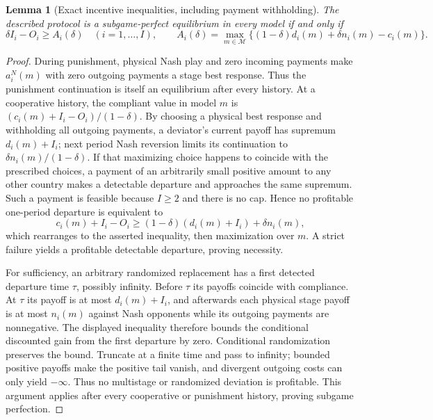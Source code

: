 \documentclass[11pt]{article}
\newtheorem{lemma}{Lemma}
\theoremstyle{definition}
\begin{document}
\begin{lemma}[Exact incentive inequalities, including payment withholding]
The described protocol is a subgame-perfect equilibrium in every model
if and only if
\[
 \delta I_i-O_i\geq A_i(\delta)\quad(i=1,\ldots,I),\qquad
 A_i(\delta)=\max_{m\in\mathcal M}
       \{(1-\delta)d_i(m)+\delta n_i(m)-c_i(m)\}.
\]
\end{lemma}
\begin{proof}
During punishment, physical Nash play and zero incoming payments make
$a_i^N(m)$ with zero outgoing payments a stage best response. Thus the
punishment continuation is itself an equilibrium after every history.
At a cooperative history, the compliant value in model $m$ is
$(c_i(m)+I_i-O_i)/(1-\delta)$. By choosing a physical best response and
withholding all outgoing payments, a deviator's current payoff has supremum
$d_i(m)+I_i$; next period Nash reversion limits its continuation to
$\delta n_i(m)/(1-\delta)$. If that maximizing choice happens to coincide
with the prescribed choices, a payment of an arbitrarily small positive
amount to any other country makes a detectable departure and approaches
the same supremum. Such a payment is feasible because $I\geq2$ and
there is no cap. Hence no profitable one-period departure is equivalent to
\[
 c_i(m)+I_i-O_i\geq
 (1-\delta)(d_i(m)+I_i)+\delta n_i(m),
\]
which rearranges to the asserted inequality, then maximization over $m$.
A strict failure yields a profitable detectable departure, proving necessity.

For sufficiency, an arbitrary randomized replacement has a first detected
departure time $\tau$, possibly infinity. Before $\tau$ its payoffs
coincide with compliance. At $\tau$ its payoff is at most $d_i(m)+I_i$,
and afterwards each physical stage payoff is at most $n_i(m)$ against
Nash opponents while its outgoing payments are nonnegative. The displayed
inequality therefore bounds the conditional discounted gain from the first
departure by zero. Conditional randomization preserves the bound. Truncate
at a finite time and pass to infinity; bounded positive payoffs make the
positive tail vanish, and divergent outgoing costs can only yield
$-\infty$. Thus no multistage or randomized deviation is profitable.
This argument applies after every cooperative or punishment history,
proving subgame perfection.
\end{proof}
\end{document}
